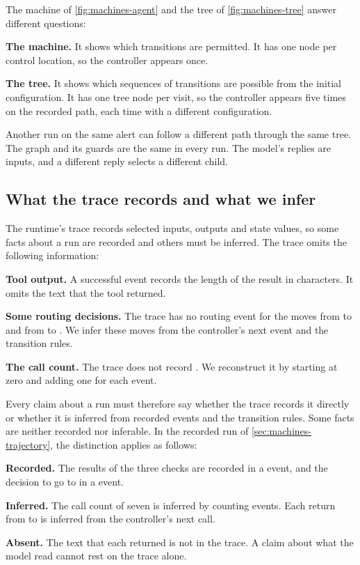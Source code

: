 The machine of \cref{fig:machines-agent} and the tree of \cref{fig:machines-tree} answer different
questions:
\bi
\item \textbf{The machine.} It shows which transitions are permitted. It has one node per control
location, so the controller appears once.
\item \textbf{The tree.} It shows which sequences of transitions are possible from the initial
configuration. It has one tree node per visit, so the controller appears five times on the recorded
path, each time with a different configuration.
\ei

Another run on the same alert can follow a different path through the same tree. The graph and its
guards are the same in every run. The model's replies are inputs, and a different reply selects a
different child.

\subsection{What the trace records and what we infer}
\label{sec:machines-recorded}

The runtime's trace records selected inputs, outputs and state values, so some facts about a run are
recorded and others must be inferred. The trace omits the following information:
\bi
\item \textbf{Tool output.} A successful  event records the length of the
result in characters. It omits the text that the tool returned.
\item \textbf{Some routing decisions.} The trace has no routing event for the moves from
 to  and from  to . We infer
these moves from the controller's next  event and the transition rules.
\item \textbf{The call count.} The trace does not record . We reconstruct it by
starting at zero and adding one for each  event.
\ei

Every claim about a run must therefore say whether the trace records it directly or whether it is
inferred from recorded events and the transition rules. Some facts are neither recorded nor
inferable. In the recorded run of \cref{sec:machines-trajectory}, the distinction applies as follows:
\bi
\item \textbf{Recorded.} The results of the three checks are recorded in a 
event, and the decision to go to  in a  event.
\item \textbf{Inferred.} The call count of seven is inferred by counting 
events. Each return from  to  is inferred from the controller's
next call.
\item \textbf{Absent.} The text that each  returned is not in the trace. A claim
about what the model read cannot rest on the trace alone.
\ei

